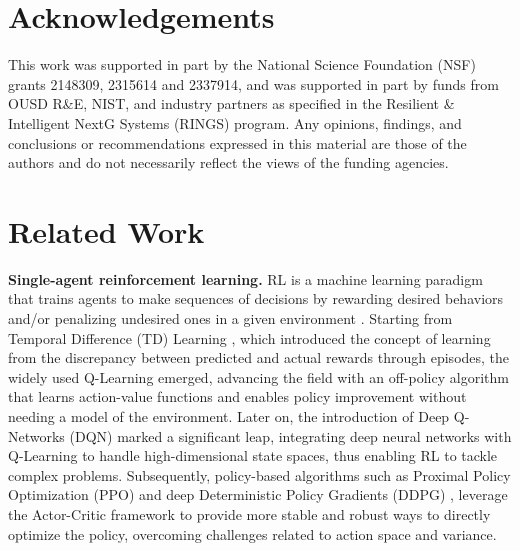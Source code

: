 \documentclass{article} %
\theoremstyle{plain}
\theoremstyle{definition}
\theoremstyle{remark}
\begin{document}
{  











\section*{Acknowledgements} 
This work was supported in part by the National Science Foundation (NSF) grants 2148309, 2315614 and 2337914, and was supported in part by funds from OUSD R\&E, NIST, and industry partners as specified in the Resilient \& Intelligent NextG Systems (RINGS) program. Any opinions, findings, and conclusions or recommendations expressed in this material are those of the authors and do not necessarily reflect the views of the funding agencies.




\appendix

\clearpage 
\section{Related Work}\label{sec:related}

\textbf{Single-agent reinforcement learning.}
RL is a machine learning paradigm that trains agents to make sequences of decisions by rewarding desired behaviors and/or penalizing undesired ones in a given environment \citep{sutton2018reinforcement}. Starting from Temporal Difference (TD) Learning \citep{sutton1988learning}, which introduced the concept of learning from the discrepancy between predicted and actual rewards through episodes, the widely used  Q-Learning \citep{watkins1992q} emerged, advancing the field with an off-policy algorithm that learns action-value functions and enables policy improvement without needing a model of the environment. Later on, the introduction of Deep Q-Networks (DQN) \citep{mnih2015human} marked a significant leap, integrating deep neural networks with Q-Learning to handle high-dimensional state spaces, thus enabling RL to tackle complex problems. Subsequently, policy-based algorithms such as Proximal Policy Optimization (PPO) \citep{schulman2017proximal} and deep Deterministic Policy Gradients (DDPG) \citep{silver2014deterministic}, leverage the Actor-Critic framework to provide more stable and robust ways to directly optimize the policy, overcoming challenges related to action space and variance. 

}
\end{document}
